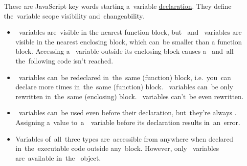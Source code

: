 These are JavaScript key words starting a~variable \hyperref[declarationdefinition]{declaration}.
They define the~variable scope visibility and~changeability.

\begin{itemize}
    \item {}~variables are~visible in the nearest function block, but~ and~ variables are visible in the nearest enclosing block, which can~be smaller than a function block.
          Accessing a~ variable outside its enclosing block causes a~ and~all the~following code isn't reached.
    \item {}~variables can~be redeclared in~the~same (function) block, i.e.~you~can declare  more times in~the~same (function) block.
          ~variables can~be only rewritten in~the~same (enclosing) block.
          ~variables can't~be even rewritten.
    \item {}~variables can~be used even before their declaration, but~they're always .
          Assigning a~value to~a~~variable before its declaration results in~an~error.
    \item Variables of~all~three types are~accessible from anywhere when declared in~the~executable code outside any~block.
          However, only ~variables are~available in~the~ object.
\end{itemize}
